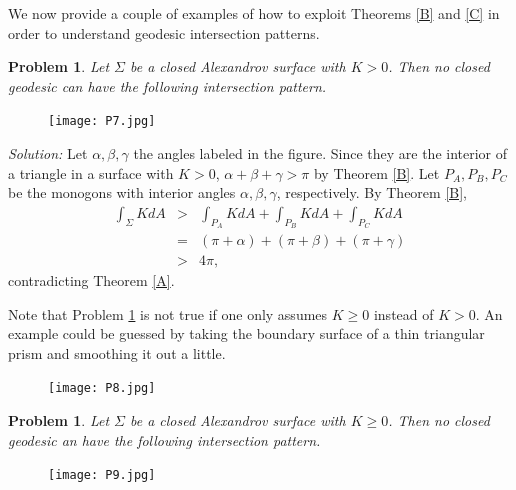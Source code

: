 \documentclass[oneside,a4paper]{amsart}
\newtheorem{prob}[thm]{Problem}
\begin{document}
We now provide a couple of examples of how to exploit Theorems \ref{B} and \ref{C} in order to understand geodesic intersection patterns.

\begin{prob}\label{D}
Let $\Sigma$ be a closed Alexandrov surface with $K > 0$. Then no closed geodesic can have the following intersection pattern.
\end{prob}


\begin{figure}[h]
\begin{center}
\texttt{[image: P7.jpg]}\\
\end{center}
\end{figure}


\textit{Solution:} Let $\alpha, \beta, \gamma$ the angles labeled in the figure. Since they are the interior of a triangle in a surface with $K > 0$, $\alpha + \beta + \gamma > \pi$ by Theorem \ref{B}. Let $P_A, P_B, P_C$ be the monogons with interior angles $\alpha, \beta, \gamma$, respectively. By Theorem \ref{B},
\begin{eqnarray}
\int_{\Sigma }K dA & > & \int_{P_A}K dA + \int_{P_B}K dA + \int_{P_C}K dA \\
& = & (\pi + \alpha ) + (\pi + \beta ) + (\pi + \gamma )\\
& > & 4 \pi ,
\end{eqnarray}
contradicting Theorem \ref{A}.

Note that Problem \ref{D} is not true if one only assumes $K \geq 0$ instead of $K > 0$. An example could be guessed by taking the boundary surface of a thin triangular prism and smoothing it out a little.


\begin{figure}[h]
\begin{center}
\texttt{[image: P8.jpg]}\\
\end{center}
\end{figure}

\begin{prob}
Let $\Sigma$ be a closed Alexandrov surface with $K \geq 0$. Then no closed geodesic an have the following intersection pattern.
\end{prob}

\begin{figure}[h]
\begin{center}
\texttt{[image: P9.jpg]}\\
\end{center}
\end{figure}
\end{document}
